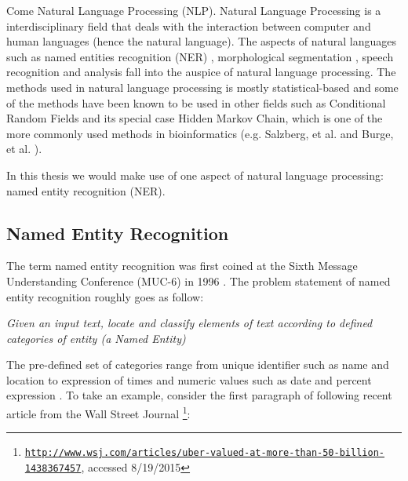 Come Natural Language Processing (NLP). Natural Language Processing is a interdisciplinary field that deals with the interaction between computer and human languages (hence the natural language). The aspects of natural languages such as named entities recognition (NER) \citep{nadeau2007survey}, morphological segmentation \citep{meyer1990morphological}, speech recognition and analysis  \citep{rabiner1993fundamentals} fall into the auspice of natural language processing. The methods used in natural language processing is mostly statistical-based \citep{manning1999foundations} and some of the methods have been known to be used in other fields such as Conditional Random Fields \citep{sutton2006introduction} and its special case Hidden Markov Chain, which is one of the more commonly used methods in bioinformatics (e.g. Salzberg, et al. \citep{salzberg1998microbial} and Burge, et al. \citep{burge1998modeling}).

In this thesis we would make use of one aspect of natural language processing: named entity recognition (NER).




\subsection{Named Entity Recognition}

\label{ssec:NERC2}

The term named entity recognition was first coined at the Sixth Message Understanding Conference (MUC-6) in 1996 \citep{nadeau2007survey} \citep{grishman1996message}. The problem statement of named entity recognition roughly goes as follow:

\begin{center}
\textit{Given an input text, locate and classify elements of text according to defined categories of entity (a Named Entity)}
\end{center}

The pre-defined set of categories range from unique identifier such as name and location to expression of times and numeric values such as date and percent expression \citep{nadeau2007survey}. To take an example, consider the first paragraph of following recent article from the Wall Street Journal \footnote{\texttt{\href{http://www.wsj.com/articles/uber-valued-at-more-than-50-billion-1438367457}{http://www.wsj.com/articles/uber-valued-at-more-than-50-billion-1438367457}}, accessed 8/19/2015}:

